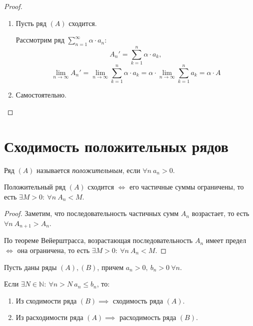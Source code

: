 \begin{proof}
    \begin{enumerate}
        \item Пусть ряд $ (A) $ сходится.

              Рассмотрим ряд $ \sum_{n=1}^{\infty}\alpha \cdot a_n $:
              \[
                  A_n' = \sum_{k=1}^{n}\alpha \cdot a_k,
              \]
              \[
                  \underset{n \rightarrow\infty}{\lim}A_n' = \underset{n \rightarrow\infty}{\lim}\sum_{k=1}^{n} \alpha \cdot a_k = \alpha \cdot \underset{n \rightarrow\infty}{\lim}\sum_{k=1}^{n}a_k = \alpha \cdot A
              \]

        \item Самостоятельно.
    \end{enumerate}
\end{proof}

\section{Сходимость положительных рядов}

\begin{definition}
    Ряд $ (A) $ называется \emph{положительным}, если $ \forall n \ a_n>0 $.
\end{definition}

\begin{theorem}\label{theorem:2.1}
    Положительный ряд $ (A) $ сходится $ \iff $ его частичные суммы ограничены, то есть $ \exists M > 0: \ \forall n \ A_n < M $.
\end{theorem}

\begin{proof}
    Заметим, что последовательность частичных сумм $ A_n $ возрастает, то есть $ \forall n \ A_{n+1} > A_n $.

    По теореме Вейерштрасса, возрастающая последовательность $ A_n $ имеет предел $ \iff $ она ограничена, то есть $ \exists M>0: \ \forall n \ A_n < M $.
\end{proof}

\begin{theorem}\label{theorem:6.2}
    Пусть даны ряды $ (A),(B) $, причем $a_n > 0, \ b_n > 0 \ \forall n$.

    Если $\exists N \in \mathbb{N}: \ \forall n > N \ a_n \leqslant b_n$, то:
    \begin{enumerate}
        \item Из сходимости ряда $(B) \implies$ сходимость ряда $(A)$.
        \item Из расходимости ряда $(A) \implies$ расходимость ряда $(B)$.
    \end{enumerate}
\end{theorem}

